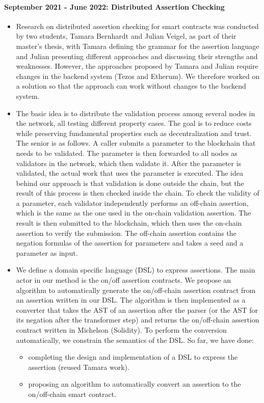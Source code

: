 \documentclass[a4paper,11pt]{article}
\begin{document}
\paragraph{September 2021 - June 2022: Distributed  Assertion Checking}
\begin{itemize}
\item Research on distributed assertion checking for smart contracts was conducted by two students, Tamara Bernhardt and Julian Veigel, as part of their master's thesis, with Tamara defining the grammar for the assertion language and Julian presenting different approaches and discussing their strengths and weaknesses. However, the approaches proposed by Tamara and Julian require changes  in the backend system (Tezos and Etherum). We therefore worked on a solution so that the approach can work without changes to the backend system.
\item 
The basic idea is to distribute the validation process among several nodes in the network, all testing different property cases. The goal is to reduce costs while preserving fundamental properties such as decentralization and trust. The senior is as follows. A caller submits a parameter to the blockchain that needs to be validated. The parameter is then forwarded to all nodes as validators in the network, which then validate it. After the parameter is validated, the actual work that uses the parameter is executed. The idea behind our approach is that validation is done outside the chain, but the result of this process is then checked inside the chain. To check the validity of a parameter, each validator independently performs an off-chain assertion, which is the same as the one used in the on-chain validation assertion. The result is then submitted to the blockchain, which then uses the on-chain assertion to verify the submission. The off-chain assertion contains the negation formulas of the assertion for parameters and takes a seed and a parameter as input.
\item We define a domain specific language (DSL) to express assertions. The main actor in our method is the on/off assertion contracts. We propose an algorithm to automatically generate the on/off-chain assertion contract from an assertion written in our DSL. The algorithm is then implemented as a converter that takes the AST of an assertion after the parser (or the AST for its negation after the transformer step) and returns the on/off-chain assertion contract written in Michelson (Solidity). To perform the conversion automatically, we constrain the semantics of the DSL. So far, we have done:
\begin{itemize}
\item completing the design and implementation of a DSL to express the assertion (reused Tamara work).
\item proposing an algorithm to automatically convert an assertion to the on/off-chain smart contract.
\end{itemize}
\end{itemize}  
\end{document}
